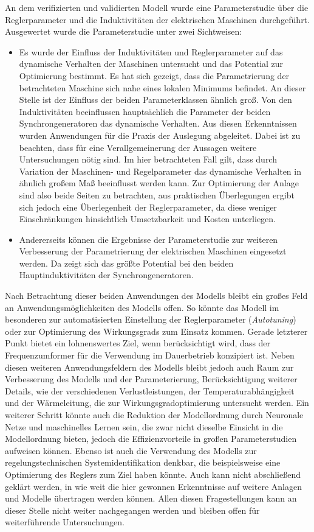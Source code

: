 An dem verifizierten und validierten Modell wurde eine Parameterstudie über die Reglerparameter und die Induktivitäten der elektrischen Maschinen durchgeführt. Ausgewertet wurde die Parameterstudie unter zwei Sichtweisen:\begin{itemize}
	\item Es wurde der Einfluss der Induktivitäten und Reglerparameter auf das dynamische Verhalten der Maschinen untersucht und das Potential zur Optimierung bestimmt. Es hat sich gezeigt, dass die Parametrierung der betrachteten Maschine sich nahe eines lokalen Minimums befindet. An dieser Stelle ist der Einfluss der beiden Parameterklassen ähnlich groß. Von den Induktivitäten beeinflussen hauptsächlich die Parameter der beiden Synchrongeneratoren das dynamische Verhalten. Aus diesen Erkenntnissen wurden Anwendungen für die Praxis der Auslegung abgeleitet. Dabei ist zu beachten, dass für eine Verallgemeinerung der Aussagen weitere Untersuchungen nötig sind. Im hier betrachteten Fall gilt, dass durch Variation der Maschinen- und Regelparameter das dynamische Verhalten in ähnlich großem Maß beeinflusst werden kann. Zur Optimierung der Anlage sind also beide Seiten zu betrachten, aus praktischen Überlegungen ergibt sich jedoch eine Überlegenheit der Reglerparameter, da diese weniger Einschränkungen hinsichtlich Umsetzbarkeit und Kosten unterliegen.
	\item Andererseits können die Ergebnisse der Parameterstudie zur weiteren Verbesserung der Parametrierung der elektrischen Maschinen eingesetzt werden. Da zeigt sich das größte Potential bei den beiden Hauptinduktivitäten der Synchrongeneratoren.
\end{itemize}

Nach Betrachtung dieser beiden Anwendungen des Modells bleibt ein großes Feld an Anwendungsmöglichkeiten des Modells offen. So könnte das Modell im besonderen zur automatisierten Einstellung der Reglerparameter (\emph{Autotuning}) oder zur Optimierung des Wirkungsgrads zum Einsatz kommen. Gerade letzterer Punkt bietet ein lohnenswertes Ziel, wenn berücksichtigt wird, dass der Frequenzumformer für die Verwendung im Dauerbetrieb konzipiert ist. Neben diesen weiteren Anwendungsfeldern des Modells bleibt jedoch auch Raum zur Verbesserung des Modells und der Parameterierung, Berücksichtigung weiterer Details, wie der verschiedenen Verlustleistungen, der Temperaturabhängigkeit und der Wärmeleitung, die zur Wirkungsgradoptimierung untersucht werden. Ein weiterer Schritt könnte auch die Reduktion der Modellordnung durch Neuronale Netze und maschinelles Lernen sein, die zwar nicht dieselbe Einsicht in die Modellordnung bieten, jedoch die Effizienzvorteile in großen Parameterstudien aufweisen können. Ebenso ist auch die Verwendung des Modells zur regelungstechnischen Systemidentifikation denkbar, die beispielsweise eine Optimierung des Reglers zum Ziel haben könnte. Auch kann nicht abschließend geklärt werden, in wie weit die hier gewonnen Erkenntnisse auf weitere Anlagen und Modelle übertragen werden können. Allen diesen Fragestellungen kann an dieser Stelle nicht weiter nachgegangen werden und bleiben offen für weiterführende Untersuchungen.
